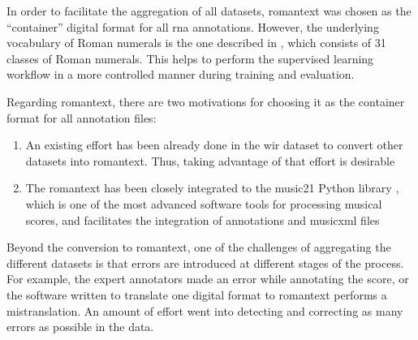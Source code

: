 
In order to facilitate the aggregation of all datasets,
\gls{romantext} was chosen as the ``container'' digital
format for all \gls{rna} annotations. However, the
underlying vocabulary of Roman numerals is the one described
in , which consists of
31 classes of Roman numerals. This helps to perform the
supervised learning workflow in a more controlled manner
during training and evaluation.

Regarding \gls{romantext}, there are two motivations for
choosing it as the container format for all annotation
files:

\begin{enumerate} 
    \item An existing effort has been already done in the
    \gls{wir} dataset
    \parencite{gotham2019romantext, gotham2022openscore}
    to convert other datasets into \gls{romantext}. Thus,
    taking advantage of that effort is desirable 
    \item The \gls{romantext} has been closely integrated to
    the music21 Python library
    \parencite{cuthbert2010music21}, which is one of the
    most advanced software tools for processing musical
    scores, and facilitates the integration of annotations
    and \gls{musicxml} files 
\end{enumerate}

Beyond the conversion to \gls{romantext}, one of the
challenges of aggregating the different datasets is that
errors are introduced at different stages of the process.
For example, the expert annotators made an error while
annotating the score, or the software written to translate
one digital format to \gls{romantext} performs a
mistranslation. An amount of effort went into detecting and
correcting as many errors as possible in the data.


